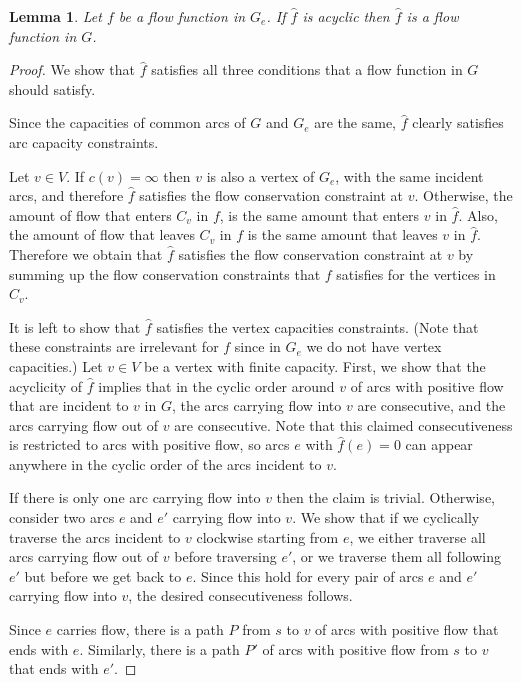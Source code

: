 \documentclass[a4paper,11pt]{article}
\newtheorem{lemma}[theorem]{Lemma}
\begin{document}
\begin{lemma} \label{lem:acyc}
    Let $f$ be a flow function in $G_e$. If $\hat{f}$ is acyclic then $\hat{f}$
is a flow function in $G$.
\end{lemma}
\begin{proof}
We show that $\hat{f}$ satisfies all three
conditions that a flow function in $G$ should satisfy.

Since the capacities of common arcs of $G$ and $G_e$  are  the same,
$\hat{f}$ clearly satisfies arc capacity constraints.

Let $v \in V$. If $c(v) = \infty$ then $v$ is also a vertex of $G_e$, with the same incident arcs,
and therefore $\hat{f}$ satisfies the flow conservation constraint at
$v$. Otherwise,  the amount of flow that enters $C_v$ in $f$,
is the same amount that enters $v$ in $\hat{f}$. Also, the amount
of flow that leaves $C_v$ in $f$ is the same amount that leaves
$v$ in $\hat{f}$. Therefore we obtain that $\hat{f}$ satisfies the flow
conservation constraint at $v$ by summing up the flow conservation
constraints that $f$ satisfies for the vertices in $C_v$.

It  is left to show that $\hat{f}$ satisfies the vertex capacities
constraints. (Note that these constraints are irrelevant for $f$
since in $G_e$ we do not have vertex capacities.) Let $v \in V$ be a
vertex with finite capacity.  First, we show that the acyclicity of
$\hat{f}$ implies that in the cyclic order around $v$ of arcs with positive
flow that are incident to $v$ in $G$, the arcs carrying flow into
$v$ are consecutive, and the arcs carrying flow out of $v$ are
consecutive. Note that this claimed consecutiveness is restricted to
arcs with positive flow, so arcs $e$ with $\hat{f}(e) = 0$ can appear
anywhere in the cyclic order of the arcs incident to $v$.


If there is only one arc carrying
 flow into $v$ then the
claim is trivial. Otherwise, consider two arcs $e$ and $e'$ carrying
flow  into $v$. We  show that if we cyclically traverse the arcs
incident to $v$ clockwise starting from $e$, we either traverse all
arcs carrying flow out of $v$ before traversing $e'$, or we traverse
them all following $e'$ but before we get back to $e$.
 Since this hold for every pair of arcs $e$ and $e'$
carrying flow into $v$, the desired consecutiveness follows.

Since $e$ carries flow,
there is a path $P$ from $s$ to $v$ of arcs with positive flow that
ends with $e$. Similarly, there is a path $P'$ of arcs with positive
flow from $s$ to $v$ that ends with $e'$.


\end{proof}
\end{document}

